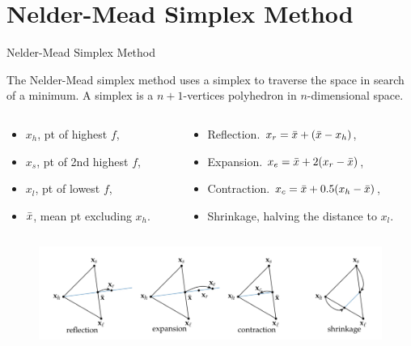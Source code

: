 \documentclass{beamer}
\begin{document}
\section{Nelder-Mead Simplex Method}
\begin{frame}{Nelder-Mead Simplex Method}

The Nelder-Mead simplex method uses a simplex to traverse the space in search
of a minimum. A simplex is a $n+1$-vertices polyhedron in $n$-dimensional space. 
\begin{columns}
\begin{column}{0.4 \textwidth}
\begin{itemize}
    \item $x_h$, pt of highest $f$, 
    \item $x_s$, pt of 2nd highest $f$, 
    \item $x_l$, pt of lowest $f$, 
    \item $\Bar{x}$, mean pt  excluding $x_h$.
\end{itemize}
\end{column}
\begin{column}{0.6 \textwidth}
\begin{itemize}
    \item Reflection. $x_r = \Bar{x} + (\Bar{x} - x_h)$, 
    \item Expansion. $x_e = \Bar{x} + 2(x_r - \Bar{x})$, 
    \item Contraction. $x_c = \Bar{x} + 0.5(x_h - \Bar{x})$, 
    \item Shrinkage, halving the distance to $x_l$.
\end{itemize}
\end{column}

\end{columns}

\begin{figure}
\centering
\includegraphics[width=120mm]{Figs/simplex.jpeg}
\end{figure}   
\end{frame}
\end{document}
